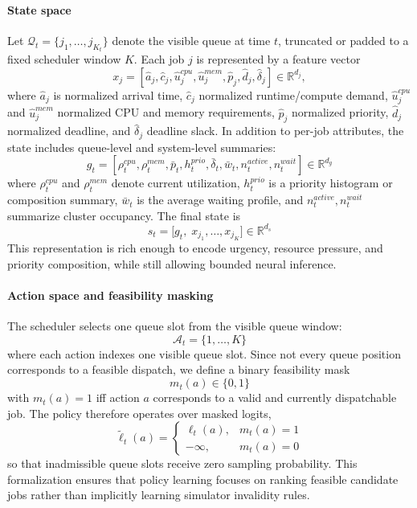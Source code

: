 \documentclass[journal]{IEEEtran}
\begin{document}
\paragraph{State space}
Let $\mathcal{Q}_t = \{j_1,\ldots,j_{K_t}\}$ denote the visible queue at time $t$, truncated or padded to a fixed scheduler window $K$. Each job $j$ is represented by a feature vector
\begin{equation}
x_j = [\hat{a}_j,\hat{c}_j,\hat{u}^{cpu}_j,\hat{u}^{mem}_j,\hat{p}_j,\hat{d}_j,\hat{\delta}_j] \in \mathbb{R}^{d_j},
\end{equation}
where $\hat{a}_j$ is normalized arrival time, $\hat{c}_j$ normalized runtime/compute demand, $\hat{u}^{cpu}_j$ and $\hat{u}^{mem}_j$ normalized CPU and memory requirements, $\hat{p}_j$ normalized priority, $\hat{d}_j$ normalized deadline, and $\hat{\delta}_j$ deadline slack. In addition to per-job attributes, the state includes queue-level and system-level summaries:
\begin{equation}
g_t = [\rho_t^{cpu}, \rho_t^{mem}, \bar{p}_t, h_t^{prio}, \bar{\delta}_t, \bar{w}_t, n_t^{active}, n_t^{wait}] \in \mathbb{R}^{d_g}
\end{equation}
where $\rho_t^{cpu}$ and $\rho_t^{mem}$ denote current utilization, $h_t^{prio}$ is a priority histogram or composition summary, $\bar{w}_t$ is the average waiting profile, and $n_t^{active},n_t^{wait}$ summarize cluster occupancy. The final state is
\begin{equation}
s_t = \Big[g_t,\; x_{j_1},\ldots,x_{j_K}\Big] \in \mathbb{R}^{d_s}
\end{equation}
This representation is rich enough to encode urgency, resource pressure, and priority composition, while still allowing bounded neural inference.

\paragraph{Action space and feasibility masking}
The scheduler selects one queue slot from the visible queue window:
\begin{equation}
\mathcal{A}_t = \{1,\ldots,K\}
\end{equation}
where each action indexes one visible queue slot. Since not every queue position corresponds to a feasible dispatch, we define a binary feasibility mask
\begin{equation}
m_t(a) \in \{0,1\}
\end{equation}
with $m_t(a)=1$ iff action $a$ corresponds to a valid and currently dispatchable job. The policy therefore operates over masked logits,
\begin{equation}
\tilde{\ell}_t(a) =
\begin{cases}
\ell_t(a), & m_t(a)=1\\
-\infty, & m_t(a)=0
\end{cases}
\end{equation}
so that inadmissible queue slots receive zero sampling probability. This formalization ensures that policy learning focuses on ranking feasible candidate jobs rather than implicitly learning simulator invalidity rules.
\end{document}
